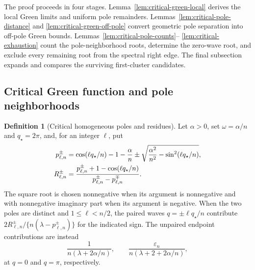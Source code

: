 \documentclass[twoside,10pt]{article}
\numberwithin{equation}{section}
\theoremstyle{slbody}
\theoremstyle{definition}
\newtheorem{definition}[theorem]{Definition}
\theoremstyle{remark}
\begin{document}
The proof proceeds in four stages.  Lemma~\ref{lem:critical-green-local}
derives the local Green limits and uniform pole remainders.
Lemmas~\ref{lem:critical-pole-distance} and
\ref{lem:critical-green-off-pole} convert geometric pole separation into
off-pole Green bounds.  Lemmas~\ref{lem:critical-pole-counts}--
\ref{lem:critical-exhaustion} count the pole-neighborhood roots, determine
the zero-wave root, and exclude every remaining root from the spectral
right edge.  The final subsection expands and compares the surviving
first-cluster candidates.

\subsection{Critical Green function and pole neighborhoods}

\begin{definition}[Critical homogeneous poles and residues]
\label{def:critical-poles}
Let $\alpha>0$, set $\omega=\alpha/n$ and $q_\star=2\pi$, and, for an
integer $\ell$, put
\begin{align}
 p_{\ell,n}^{\pm}
 &=\cos(\ell q_\star/n)-1-\frac\alpha n
 \pm\sqrt{\frac{\alpha^2}{n^2}-\sin^2(\ell q_\star/n)},\notag\\
 R_{\ell,n}^\pm
 &=\frac{p_{\ell,n}^\pm+1-\cos(\ell q_\star/n)}
       {p_{\ell,n}^\pm-p_{\ell,n}^\mp}.
 \label{eq:critical-pole-fraction}
\end{align}
The square root is chosen nonnegative when its argument is nonnegative
and with nonnegative imaginary part when its argument is negative.
When the two poles are distinct and $1\le\ell<n/2$, the paired waves
$q=\pm\ell q_\star/n$ contribute
$2R_{\ell,n}^\pm/
\{n(\lambda-p_{\ell,n}^\pm)\}$ for the indicated sign.  The unpaired
endpoint contributions are instead
\[
 \frac{1}{n(\lambda+2\alpha/n)},
 \qquad
 \frac{\varepsilon_n}{n(\lambda+2+2\alpha/n)},
\]
at $q=0$ and $q=\pi$, respectively.
\end{definition}
\end{document}
